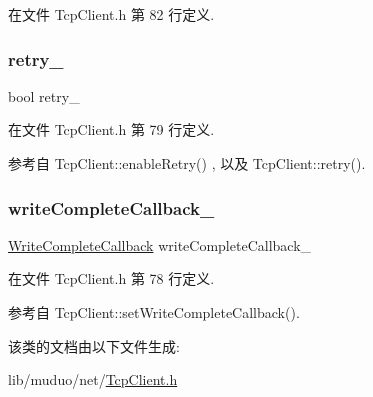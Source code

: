 在文件 Tcp\+Client.\+h 第 82 行定义.

\mbox{\label{classmuduo_1_1net_1_1TcpClient_ae072450f4c07a3dbceed969b99c8df7f}} 
\subsubsection{\texorpdfstring{retry\+\_\+}{retry\_}}
{\footnotesize\ttfamily bool retry\+\_\+\hspace{0.3cm}{\ttfamily [private]}}



在文件 Tcp\+Client.\+h 第 79 行定义.



参考自 Tcp\+Client\+::enable\+Retry() , 以及 Tcp\+Client\+::retry().

\mbox{\label{classmuduo_1_1net_1_1TcpClient_a525f0d11cfa2e271600caa30407b6150}} 
\subsubsection{\texorpdfstring{write\+Complete\+Callback\+\_\+}{writeCompleteCallback\_}}
{\footnotesize\ttfamily \hyperlink{namespacemuduo_1_1net_a525c3730bfefb763975b035ebc88a63d}{Write\+Complete\+Callback} write\+Complete\+Callback\+\_\+\hspace{0.3cm}{\ttfamily [private]}}



在文件 Tcp\+Client.\+h 第 78 行定义.



参考自 Tcp\+Client\+::set\+Write\+Complete\+Callback().



该类的文档由以下文件生成\+:\begin{DoxyCompactItemize}
\item 
lib/muduo/net/\hyperlink{muduo_2net_2TcpClient_8h}{Tcp\+Client.\+h}\end{DoxyCompactItemize}
